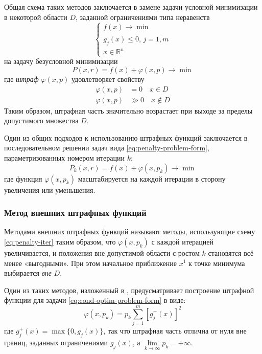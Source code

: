 \documentclass{article}
\renewcommand{\phi}{\varphi}
\renewcommand{\leq}{\leqslant}
\newcommand{\neword}{\emph}
\newcommand{\set}[1]{\mathbb{#1}}
\theoremstyle{remark}
\theoremstyle{definition}
\numberwithin{equation}{section}
\begin{document}
Общая схема таких методов заключается в замене задачи условной
минимизации в некоторой области $D$, заданной ограничениями типа
неравенств
\begin{equation*}
  \begin{cases}
    f(x) \to \min \\
    g_j(x) \leq 0,\, j=\overline{1,m} \\
    x \in \set{R}^n
  \end{cases}
\end{equation*}
на задачу безусловной минимизации
\begin{equation}
  \label{eq:penalty-problem-form}
  P(x, r) = f(x) + \phi(x, p) \to \min
\end{equation}
где \neword{штраф} $\phi(x, p)$ удовлетворяет свойству
\begin{align*}
  \phi(x, p) &= 0 \quad x \in D\\
  \phi(x, p) &\gg 0 \quad x \notin D
\end{align*}
Таким образом, штрафная часть значительно возрастает при выходе за
пределы допустимого множества $D$.

Один из общих подходов к использованию штрафных функций заключается в
последовательном решении задач вида \ref{eq:penalty-problem-form},
параметризованных номером итерации $k$:
\begin{equation}
  \label{eq:penalty-iter}
  P_k(x, r) = f(x) + \phi(x, p_k) \to \min  
\end{equation}
где функция $\phi(x, p_k)$ масштабируется на каждой итерации в сторону
увеличения или уменьшения.

\subsubsection{Метод внешних штрафных функций}

Методами внешних штрафных функций называют методы, использующие схему
\eqref{eq:penalty-iter} таким образом, что $\phi(x, p_k)$ с каждой
итерацией увеличивается, и положения вне допустимой области с ростом
$k$ становятся всё менее «выгодными». При этом начальное приближение
$x^1$ к точке минимума выбирается \emph{вне} $D$.

Один из таких методов, изложенный в \cite{himmelblau75},
предусматривает построение штрафной функции для задачи
\eqref{eq:cond-optim-problem-form} в виде:
\begin{equation}
  \label{eq:weisman}
  \phi(x, p_k) = p_k \sum_{j=1}^m{ \left [ g_j^+(x) \right ]^2}
\end{equation}
где $g_j^+(x) = \max\{0, g_j(x)\}$, так что штрафная часть отлична от
нуля вне границ, заданных ограничениями $g_j(x)$, а
$\lim\limits_{k\to\infty}{p_k} = +\infty$.
\end{document}
